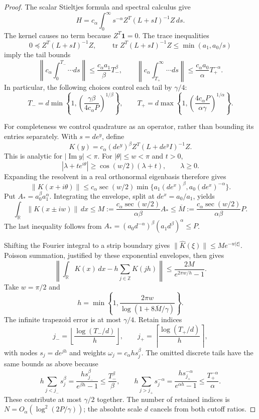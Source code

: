 \documentclass[11pt]{article}
\newcommand{\tr}{\operatorname{tr}}
\newcommand{\R}{\mathbb R}
\begin{document}
\begin{proof}
The scalar Stieltjes formula and spectral calculus give
\[
 H=c_\alpha\int_0^\infty
       s^{-\alpha}Z^T(L+sI)^{-1}Z\,ds.
\]
The kernel causes no term because $Z^T\mathbf1=0$.
The trace inequalities
\[
 0\preceq Z^T(L+sI)^{-1}Z,
 \qquad
 \tr Z^T(L+sI)^{-1}Z\le\min(a_1,a_0/s)
\]
imply the tail bounds
\[
 \left\|c_\alpha\int_0^{T_-}\cdots ds\right\|
       \le\frac{c_\alpha a_1}{\beta}T_-^\beta,
 \qquad
 \left\|c_\alpha\int_{T_+}^{\infty}\cdots ds\right\|
       \le\frac{c_\alpha a_0}{\alpha}T_+^{-\alpha}.
\]
In particular, the following choices control each tail by $\gamma/4$:
\[
 T_-=d\min\left\{1,
       \left(\frac{\gamma\beta}{4c_\alpha P}\right)^{1/\beta}\right\},
 \qquad
 T_+=d\max\left\{1,
       \left(\frac{4c_\alpha P}{\alpha\gamma}\right)^{1/\alpha}\right\}.
\]

For completeness we control quadrature as an operator, rather than
bounding its entries separately.  With $s=de^y$, define
\[
 K(y)=c_\alpha (de^y)^\beta
                Z^T(L+de^yI)^{-1}Z.
\]
This is analytic for $|\operatorname{Im}y|<\pi$.
For $|\theta|\le w<\pi$ and $t>0$,
\[
 |\lambda+te^{i\theta}|\ge\cos(w/2)(\lambda+t),
 \qquad \lambda\ge0.
\]
Expanding the resolvent in a real orthonormal eigenbasis therefore gives
\[
 \|K(x+i\theta)\|
 \le c_\alpha\sec(w/2)
       \min\{a_1(de^x)^\beta,a_0(de^x)^{-\alpha}\}.
\]
Put $A_*=a_0^\beta a_1^\alpha$.  Integrating the envelope, split at
$de^x=a_0/a_1$, yields
\[
 \int_{\R}\|K(x\pm iw)\|\,dx
 \le M:=\frac{c_\alpha\sec(w/2)}{\alpha\beta}A_*
 \le \overline M:=\frac{c_\alpha\sec(w/2)}{\alpha\beta}P.
\]
The last inequality follows from
$A_*=(a_0d^{-\alpha})^\beta(a_1d^\beta)^\alpha\le P$.

Shifting the Fourier integral to a strip boundary gives
$\|\widehat K(\xi)\|\le M e^{-w|\xi|}$.
Poisson summation, justified by these exponential envelopes, then gives
\[
 \left\|\int_\R K(x)\,dx-h\sum_{j\in\mathbb Z}K(jh)\right\|
 \le\frac{2M}{e^{2\pi w/h}-1}.
\]
Take $w=\pi/2$ and
\[
 h=\min\left\{1,
       \frac{2\pi w}{\log(1+8\overline M/\gamma)}\right\}.
\]
The infinite trapezoid error is at most $\gamma/4$.
Retain indices
\[
 j_- =\left\lfloor\frac{\log(T_-/d)}h\right\rfloor,
 \qquad
 j_+ =\left\lceil\frac{\log(T_+/d)}h\right\rceil,
\]
with nodes $s_j=de^{jh}$ and weights
$\omega_j=c_\alpha h s_j^\beta$.
The omitted discrete tails have the same bounds as above because
\[
 h\sum_{j<j_-}s_j^\beta
   =\frac{h s_{j_-}^\beta}{e^{\beta h}-1}
   \le\frac{T_-^\beta}{\beta},
 \qquad
 h\sum_{j>j_+}s_j^{-\alpha}
   =\frac{h s_{j_+}^{-\alpha}}{e^{\alpha h}-1}
   \le\frac{T_+^{-\alpha}}\alpha.
\]
These contribute at most $\gamma/2$ together.  The number of retained
indices is $N=O_\alpha(\log^2(2P/\gamma))$; the absolute scale $d$
cancels from both cutoff ratios.


\end{proof}
\end{document}
